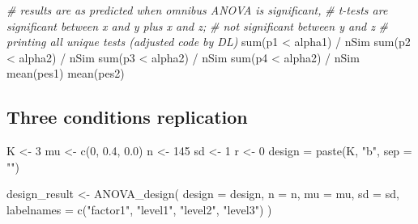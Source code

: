 \documentclass[
]{book}
\newenvironment{Shaded}{\begin{snugshade}}{\end{snugshade}}
\newcommand{\AttributeTok}[1]{\textcolor[rgb]{0.77,0.63,0.00}{#1}}
\newcommand{\CommentTok}[1]{\textcolor[rgb]{0.56,0.35,0.01}{\textit{#1}}}
\newcommand{\DecValTok}[1]{\textcolor[rgb]{0.00,0.00,0.81}{#1}}
\newcommand{\FloatTok}[1]{\textcolor[rgb]{0.00,0.00,0.81}{#1}}
\newcommand{\FunctionTok}[1]{\textcolor[rgb]{0.00,0.00,0.00}{#1}}
\newcommand{\NormalTok}[1]{#1}
\newcommand{\OtherTok}[1]{\textcolor[rgb]{0.56,0.35,0.01}{#1}}
\newcommand{\SpecialCharTok}[1]{\textcolor[rgb]{0.00,0.00,0.00}{#1}}
\newcommand{\StringTok}[1]{\textcolor[rgb]{0.31,0.60,0.02}{#1}}
\begin{document}
\begin{Shaded}
\begin{Highlighting}[]
\CommentTok{\# results are as predicted when omnibus ANOVA is significant, }
\CommentTok{\# t{-}tests are significant between x and y plus x and z; }
\CommentTok{\# not significant between y and z}
\CommentTok{\# printing all unique tests (adjusted code by DL)}
\FunctionTok{sum}\NormalTok{(p1 }\SpecialCharTok{\textless{}}\NormalTok{ alpha1) }\SpecialCharTok{/}\NormalTok{ nSim}
\FunctionTok{sum}\NormalTok{(p2 }\SpecialCharTok{\textless{}}\NormalTok{ alpha2) }\SpecialCharTok{/}\NormalTok{ nSim}
\FunctionTok{sum}\NormalTok{(p3 }\SpecialCharTok{\textless{}}\NormalTok{ alpha2) }\SpecialCharTok{/}\NormalTok{ nSim}
\FunctionTok{sum}\NormalTok{(p4 }\SpecialCharTok{\textless{}}\NormalTok{ alpha2) }\SpecialCharTok{/}\NormalTok{ nSim}
\FunctionTok{mean}\NormalTok{(pes1)}
\FunctionTok{mean}\NormalTok{(pes2)}
\end{Highlighting}
\end{Shaded}

\hypertarget{three-conditions-replication-1}{%
\subsection{Three conditions replication}\label{three-conditions-replication-1}}

\begin{Shaded}
\begin{Highlighting}[]
\NormalTok{K }\OtherTok{\textless{}{-}} \DecValTok{3}
\NormalTok{mu }\OtherTok{\textless{}{-}} \FunctionTok{c}\NormalTok{(}\DecValTok{0}\NormalTok{, }\FloatTok{0.4}\NormalTok{, }\FloatTok{0.0}\NormalTok{)}
\NormalTok{n }\OtherTok{\textless{}{-}} \DecValTok{145}
\NormalTok{sd }\OtherTok{\textless{}{-}} \DecValTok{1}
\NormalTok{r }\OtherTok{\textless{}{-}} \DecValTok{0}
\NormalTok{design }\OtherTok{=} \FunctionTok{paste}\NormalTok{(K, }\StringTok{"b"}\NormalTok{, }\AttributeTok{sep =} \StringTok{""}\NormalTok{)}
\end{Highlighting}
\end{Shaded}

\begin{Shaded}
\begin{Highlighting}[]
\NormalTok{design\_result }\OtherTok{\textless{}{-}} \FunctionTok{ANOVA\_design}\NormalTok{(}
  \AttributeTok{design =}\NormalTok{ design,}
  \AttributeTok{n =}\NormalTok{ n,}
  \AttributeTok{mu =}\NormalTok{ mu,}
  \AttributeTok{sd =}\NormalTok{ sd,}
  \AttributeTok{labelnames =} \FunctionTok{c}\NormalTok{(}\StringTok{"factor1"}\NormalTok{, }\StringTok{"level1"}\NormalTok{, }\StringTok{"level2"}\NormalTok{, }\StringTok{"level3"}\NormalTok{)}
\NormalTok{  )}
\end{Highlighting}
\end{Shaded}
\end{document}
